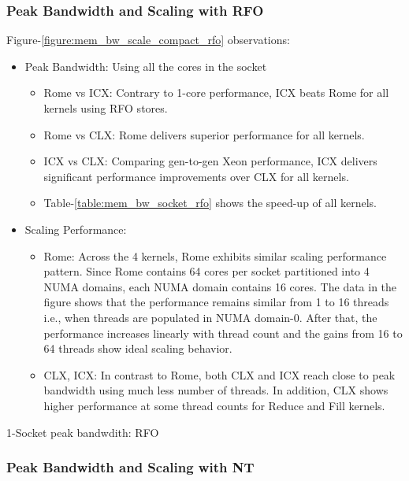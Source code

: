 \documentclass{article}
\begin{document}
\subsubsection{Peak Bandwidth and Scaling with RFO}
Figure-\ref{figure:mem_bw_scale_compact_rfo} observations:
\begin{itemize}
\item Peak Bandwidth: Using all the cores in the socket
\begin{itemize}
\item Rome vs ICX: Contrary to 1-core performance, ICX beats Rome for all kernels using RFO stores.
\item Rome vs CLX: Rome delivers superior performance for all kernels.
\item ICX vs CLX: Comparing gen-to-gen Xeon performance, ICX delivers significant performance improvements over CLX for all kernels.
\item Table-\ref{table:mem_bw_socket_rfo} shows the speed-up of all kernels.
\end{itemize}
\item Scaling Performance: 
\begin{itemize}
\item Rome: Across the 4 kernels, Rome exhibits similar scaling performance pattern. Since Rome contains 64 cores per socket partitioned into 4 NUMA domains, each NUMA domain contains 16 cores. The data in the figure shows that the performance remains similar from 1 to 16 threads i.e., when threads are populated in NUMA domain-0. After that, the performance increases linearly with thread count and the gains from 16 to 64 threads show ideal scaling behavior.
\item CLX, ICX: In contrast to Rome, both CLX and ICX reach close to peak bandwidth using much less number of threads. In addition, CLX shows higher performance at some thread counts for Reduce and Fill kernels. 
\end{itemize}
\end{itemize}

\begin{table}[h!]
\centering

\caption{1-Socket peak bandwdith: RFO}
\label{table:mem_bw_socket_rfo}
\end{table}

\subsubsection{Peak Bandwidth and Scaling with NT}
\end{document}
